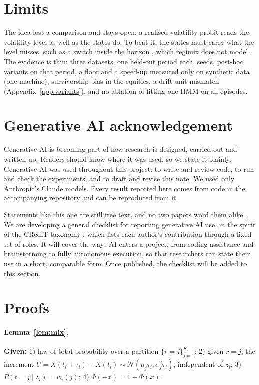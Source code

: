 \documentclass{article}
\begin{document}
\section{Limits}
\label{sec:limits}

The idea lost a comparison and stays open: a realised-volatility probit reads the volatility level as well as the states do.
To beat it, the states must carry what the level misses, such as a switch inside the horizon \citep{hardy2001}, which regimix does not model.
The evidence is thin: three datasets, one held-out period each, \nFxSeeds{} seeds, post-hoc variants on that period, a floor and a speed-up measured only on synthetic data (one machine), survivorship bias in the equities, a drift unit mismatch (Appendix~\ref{app:variants}), and no ablation of fitting one HMM on all episodes.

\section*{Generative AI acknowledgement}
Generative AI is becoming part of how research is designed, carried out and written up. Readers should know where it was used, so we state it plainly. Generative AI was used throughout this project: to write and review code, to run and check the experiments, and to draft and revise this note. We used only Anthropic's Claude models. Every result reported here comes from code in the accompanying repository and can be reproduced from it.

Statements like this one are still free text, and no two papers word them alike. We are developing a general checklist for reporting generative AI use, in the spirit of the CRediT taxonomy \citep{brand2015credit}, which lists each author's contribution through a fixed set of roles. It will cover the ways AI enters a project, from coding assistance and brainstorming to fully autonomous execution, so that researchers can state their use in a short, comparable form. Once published, the checklist will be added to this section.




\appendix

\section{Proofs}
\label{app:proofs}

\paragraph{Lemma~\ref{lem:mix}.}
\textbf{Given:}
1) law of total probability over a partition $\{r=j\}_{j=1}^{K}$;
2) given $r=j$, the increment $U=X(t_i+\tau_i)-X(t_i)\sim\mathcal N(\mu_j\tau_i,\sigma_j^2\tau_i)$, independent of $z_i$;
3) $P(r=j\mid z_i)=w_i(j)$;
4) $\Phi(-x)=1-\Phi(x)$.
\end{document}
